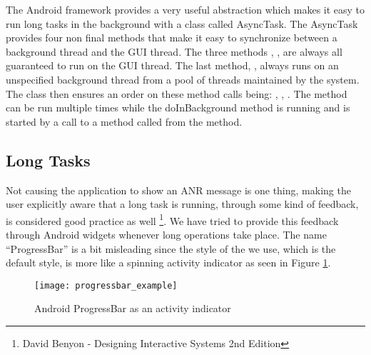 The Android framework provides a very useful abstraction which makes it easy to run long tasks in the background with a class called AsyncTask. The AsyncTask provides four non final methods that make it easy to synchronize between a background thread and the GUI thread. The three methods , ,  are always all guaranteed to run on the GUI thread. The last method, , always runs on an unspecified background thread from a pool of threads maintained by the system. The class then ensures an order on these method calls being: , , . The  method can be run multiple times while the doInBackground method is running and is started by a call to a method called  from the  method.  

\subsection{Long Tasks}

Not causing the application to show an ANR message is one thing, making the user explicitly aware that a long task is running, through some kind of feedback, is considered good practice as well \footnote{David Benyon - Designing Interactive Systems 2nd Edition}. We have tried to provide this feedback through Android  widgets whenever long operations take place. The name ``ProgressBar'' is a bit misleading since the style of the  we use, which is the default style, is more like a spinning activity indicator as seen in Figure \ref{fig:activity_indicator}. 

\begin{figure}[!htbp]
        \centering
        \texttt{[image: progressbar\_example]}
        \caption{Android ProgressBar as an activity indicator}
        \label{fig:activity_indicator}
\end{figure}